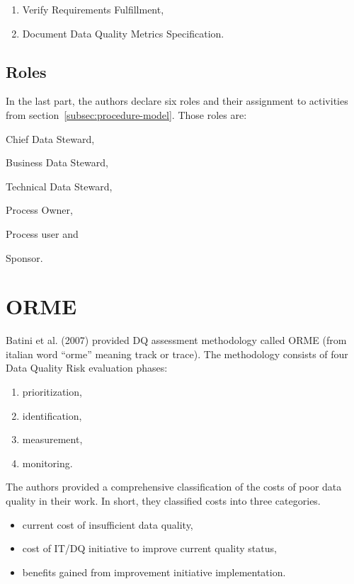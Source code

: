 \begin{enumerate}
    \item Verify Requirements Fulfillment,
    \item Document Data Quality Metrics Specification.
\end{enumerate}

\subsection{Roles}

In the last part, the authors declare six roles and their assignment to activities from section~\ref{subsec:procedure-model}.
Those roles are:
\begin{enumerate*}[label=(\roman*)]
    \item Chief Data Steward,
    \item Business Data Steward,
    \item Technical Data Steward,
    \item Process Owner,
    \item Process user and
    \item Sponsor.
\end{enumerate*}

\section{ORME}

Batini et al. (2007) provided DQ assessment methodology called ORME (from italian word \enquote{orme} meaning track or trace).
The methodology consists of four Data Quality Risk evaluation phases:

\begin{enumerate}
    \item prioritization,
    \item identification,
    \item measurement,
    \item monitoring.
\end{enumerate}

The authors provided a comprehensive classification of the costs of poor data quality in their work.
In short, they classified costs into three categories.

\begin{itemize}
    \item current cost of insufficient data quality,
    \item cost of IT/DQ initiative to improve current quality status,
    \item benefits gained from improvement initiative implementation.
\end{itemize}

